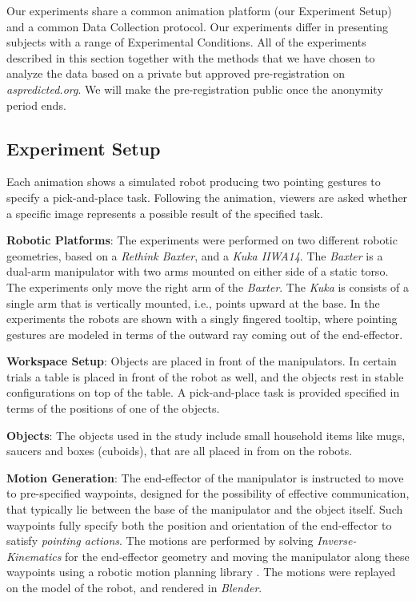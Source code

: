 Our experiments share a common animation platform (our Experiment Setup) and a common Data Collection protocol.  Our experiments differ in presenting subjects with a range of Experimental Conditions.  All of the experiments described in this section together with the methods that we have chosen to analyze the data based on a private but approved pre-registration on \textit{aspredicted.org}. We will make the pre-registration public once the anonymity period ends.

\subsection{Experiment Setup}
Each animation shows a simulated robot producing two pointing gestures to specify a pick-and-place task.  Following the animation, viewers are asked whether a specific image represents a possible result of the specified task.

\noindent\textbf{Robotic Platforms}: The experiments were performed on two different robotic geometries, based on a \textit{Rethink Baxter}, and a \textit{Kuka IIWA14}.  The \textit{Baxter} is a dual-arm manipulator with two arms mounted on either side of a static torso. The experiments only move the right arm of the \textit{Baxter}. The \textit{Kuka} is consists of a single arm that is vertically mounted, i.e., points upward at the base. In the experiments the robots are shown with a singly fingered tooltip, where pointing gestures are modeled in terms of the outward ray coming out of the end-effector.

\noindent\textbf{Workspace Setup}: Objects are placed in front of the manipulators. In certain trials a table is placed in front of the robot as well, and the objects rest in stable configurations on top of the table. A pick-and-place task is provided specified in terms of the positions of one of the objects. 

\noindent\textbf{Objects}: The objects used in the study include small household items like mugs, saucers and boxes (cuboids), that are all placed in from on the robots.

\noindent\textbf{Motion Generation}: The end-effector of the manipulator is instructed to move to pre-specified waypoints, designed for the possibility of effective communication, that typically lie between the base of the manipulator and the object itself. Such waypoints fully specify both the position and orientation of the end-effector to satisfy \textit{pointing actions}. The motions are performed by solving \textit{Inverse-Kinematics} for the end-effector geometry and moving the manipulator along these waypoints using a robotic motion planning library \cite{littlefield2014extensible}. The motions were replayed on the model of the robot, and rendered in \textit{Blender}.

